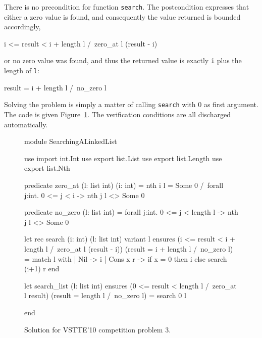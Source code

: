 There is no precondition for function \texttt{search}.
The postcondition expresses that either a zero value is found, and
consequently the value returned is bounded accordingly,
\begin{whycode}
  i <= result < i + length l /\ zero_at l (result - i)
\end{whycode}
or no zero value was found, and thus the returned value is exactly
\texttt{i} plus the length of \texttt{l}:
\begin{whycode}
  result = i + length l /\ no_zero l
\end{whycode}
Solving the problem is simply a matter of calling \texttt{search} with
0 as first argument.
The code is given Figure~\ref{fig:LinkedList}.
The verification conditions are all discharged automatically.
\begin{figure}
  \centering
\begin{whycode}
module SearchingALinkedList

  use import int.Int
  use export list.List
  use export list.Length
  use export list.Nth

  predicate zero_at (l: list int) (i: int) =
    nth i l = Some 0 /\ forall j:int. 0 <= j < i -> nth j l <> Some 0

  predicate no_zero (l: list int) =
    forall j:int. 0 <= j < length l -> nth j l <> Some 0

  let rec search (i: int) (l: list int) variant { l }
    ensures { (i <= result < i + length l /\ zero_at l (result - i))
           \/ (result = i + length l /\ no_zero l) }
  = match l with
    | Nil -> i
    | Cons x r -> if x = 0 then i else search (i+1) r
    end

  let search_list (l: list int)
    ensures { (0 <= result < length l /\ zero_at l result)
           \/ (result = length l /\ no_zero l) }
  = search 0 l

end
\end{whycode}
\vspace*{-1em}%
  \caption{Solution for VSTTE'10 competition problem 3.}
  \label{fig:LinkedList}
\end{figure}

